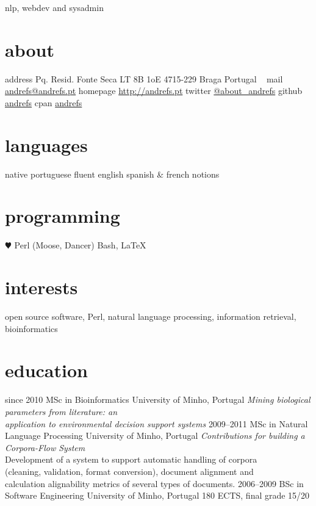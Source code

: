\documentclass[a4paper]{friggeri-cv}
\begin{document}
       {nlp, webdev and sysadmin}


\begin{aside}
  \section{about}
  	{\scriptsize address}
  	Pq. Resid. Fonte Seca
	LT 8B 1oE
	4715-229 Braga
	Portugal
    ~
  	{\scriptsize mail}
    \href{mailto:andrefs@andrefs.pt}{\small andrefs@andrefs.pt}
  	{\scriptsize homepage}
    \href{http://andrefs.pt}{\small http://andrefs.pt}
  	{\scriptsize twitter}
    \href{http://twitter.com/about\_andrefs}{\small @about\_andrefs}
  	{\scriptsize github}
    \href{http://github.com/andrefs}{\small andrefs}
  	{\scriptsize cpan}
    \href{http://search.cpan.org/~andrefs}{andrefs}
  \section{languages}
  	native portuguese
	fluent english
    spanish \& french notions
  \section{programming}
    {$\varheartsuit$} Perl
    (Moose, Dancer)
	Bash, \LaTeX
\end{aside}

\section{interests}

open source software, Perl, natural language processing, information retrieval,
bioinformatics

\section{education}

\begin{entrylist}
  \entry
    {{\footnotesize since} 2010}
    {MSc in Bioinformatics}
    {University of Minho, Portugal}
    {\emph{Mining biological parameters from literature: an\\
	application to environmental decision support systems}}
  \entry
    {2009–2011}
    {MSc in Natural Language Processing}
    {University of Minho, Portugal}
    {\emph{Contributions for building a Corpora-Flow System}\\
	\footnotesize{Development of a system to support automatic handling of corpora\\
	(cleaning, validation, format conversion), document alignment and\\
	calculation alignability metrics of several types of documents.}
	}
  \entry
    {2006--2009}
    {BSc in Software Engineering}
    {University of Minho, Portugal}
    {180 ECTS, final grade 15/20}
\end{entrylist}
\end{document}
